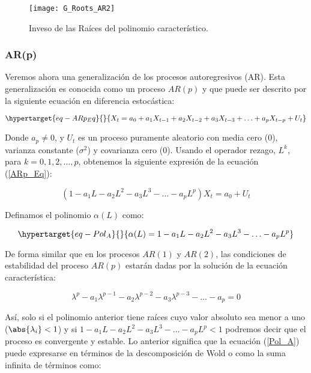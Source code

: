 \documentclass[
  a4paper,
]{article}
\begin{document}
\begin{figure}
  \centering
    \texttt{[image: G\_Roots\_AR2]}
  \caption{Inveso de las Raíces del polinomio característico.}
  \label{G_Roots_AR2}
\end{figure}

\hypertarget{arp}{%
\subsubsection{AR(p)}\label{arp}}

Veremos ahora una generalización de los procesos autoregresivos (AR).
Esta generalización es conocida como un proceso \(AR(p)\) y que puede
ser descrito por la siguiente ecuación en diferencia estocástica:

\begin{equation}\protect\hypertarget{eq-ARp_Eq}{}{
X_t = a_0 + a_1 X_{t-1} + a_2 X_{t-2} + a_3 X_{t-3} + \ldots + a_p X_{t-p} + U_t
}\label{eq-ARp_Eq}\end{equation}

Donde \(a_p \neq 0\), y \(U_t\) es un proceso puramente aleatorio con
media cero (0), varianza constante (\(\sigma^2\)) y covarianza cero (0).
Usando el operador rezago, \(L^k\), para \(k = 0, 1, 2, \ldots, p\),
obtenemos la siguiente expresión de la ecuación (\ref{ARp_Eq}):

\[
(1 - a_1 L - a_2 L^2 - a_3 L^3 - \ldots - a_p L^p) X_t = a_0 + U_t
\]

Definamos el polinomio \(\alpha(L)\) como:

\begin{equation}\protect\hypertarget{eq-Pol_A}{}{
\alpha(L) = 1 - a_1 L - a_2 L^2 - a_3 L^3 - \ldots - a_p L^p
}\label{eq-Pol_A}\end{equation}

De forma similar que en los procesos \(AR(1)\) y \(AR(2)\), las
condiciones de estabilidad del proceso \(AR(p)\) estarán dadas por la
solución de la ecuación característica:

\[
\lambda^p - a_1 \lambda^{p-1} - a_2 \lambda^{p-2} - a_3 \lambda^{p-3} - \ldots - a_p = 0
\]

Así, solo si el polinomio anterior tiene raíces cuyo valor absoluto sea
menor a uno (\(\abs{\lambda_i} < 1\)) y si
\(1 - a_1 L - a_2 L^2 - a_3 L^3 - \ldots - a_p L^p < 1\) podremos decir
que el proceso es convergente y estable. Lo anterior significa que la
ecuación (\ref{Pol_A}) puede expresarse en términos de la descomposición
de Wold o como la suma infinita de términos como:
\end{document}
